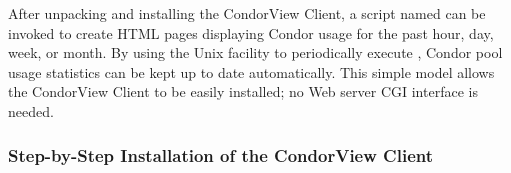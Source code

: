 After unpacking and installing the CondorView Client, a script named
 can be invoked to create HTML pages displaying Condor usage
for the past hour, day, week, or month.  
By using the Unix  facility to periodically execute
, Condor pool usage statistics can be kept up to date
automatically.  
This simple model allows the CondorView Client to be easily installed;
no Web server CGI interface is needed.

\subsubsection{\label{sec:condorview-client-step-by-step}
Step-by-Step Installation of the CondorView Client}

